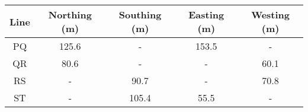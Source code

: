 \begin{center}
\begin{tabular}{|c|c|c|c|c|}
\hline
Line & Northing (m) & Southing (m) & Easting (m) & Westing (m) \\ \hline
PQ & 125.6 & - & 153.5 & - \\ \hline
QR & 80.6 & - & - & 60.1 \\ \hline
RS & - & 90.7 & - & 70.8 \\ \hline
ST & - & 105.4 & 55.5 & - \\ \hline
\end{tabular}
\end{center}
